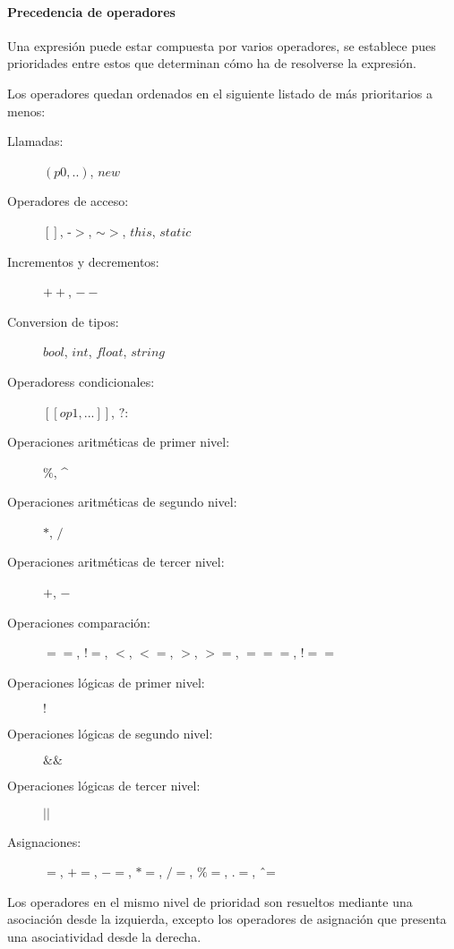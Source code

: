 
\paragraph{Precedencia de operadores} \label{sec:op_pre}

Una expresión puede estar compuesta por varios operadores, se establece pues prioridades entre estos que determinan 
cómo ha de resolverse la expresión. 

Los operadores quedan ordenados en el siguiente listado de más prioritarios a menos:

\begin{description}
\item [Llamadas:] $(p0,..)$, $new$
\item [Operadores de acceso:] $[]$, -$>$, $\sim>$, $this$, $static$
\item [Incrementos y decrementos:] $++$, $--$
\item [Conversion de tipos:] $bool$, $int$, $float$, $string$
\item [Operadoress condicionales:] $[[op1,...]]$, $?:$
\item [Operaciones aritméticas de primer nivel:] $\%$, \^ \hfill  
\item [Operaciones aritméticas de segundo nivel:] $*$, $/$
\item [Operaciones aritméticas de tercer nivel:] $+$, $-$
\item [Operaciones comparación:] $==$, $!=$, $<$, $<=$, $>$, $>=$, $===$, $!==$
\item [Operaciones lógicas de primer nivel:] $!$
\item [Operaciones lógicas de segundo nivel:] $\&\&$
\item [Operaciones lógicas de tercer nivel:] $||$
\item [Asignaciones:] $=$, $+=$, $-=$, $*=$, $/=$, $\%=$, $.=$, \^ \ =\hfill 
\end{description} 

Los operadores en el mismo nivel de prioridad son resueltos mediante una asociación desde la izquierda, excepto
los operadores de asignación que presenta una asociatividad desde la derecha.

